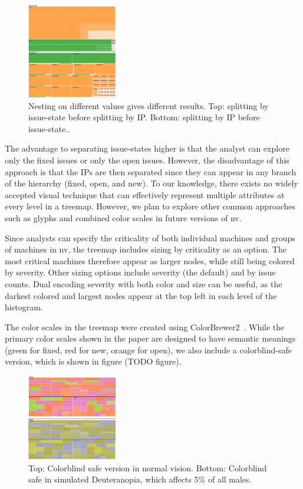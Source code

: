 \documentclass{acm_proc_article-sp}
\begin{document}
\begin{figure}
  \centering
  \includegraphics[width=0.35\textwidth]{../screenshots/state_issue}
  \caption{Nesting on different values gives different results. Top: splitting by issue-state before splitting by IP. Bottom: splitting by IP before issue-state..}
\end{figure}

The advantage to separating issue-states higher is that the analyst can explore only the fixed issues or only the open issues.
However, the disadvantage of this approach is that the IPs are then separated since they can appear in any branch of the hierarchy (fixed, open, and new).
To our knowledge, there exists no widely accepted visual technique that can effectively represent multiple attributes at every level in a treemap.
However, we plan to explore other common approaches such as glyphs and combined color scales in future versions of nv.


Since analysts can specify the criticality of both individual machines and groups of machines in nv, the treemap includes sizing by criticality as an option.
The most critical machines therefore appear as larger nodes, while still being colored by severity.
Other sizing options include severity (the default) and by issue counts.
Dual encoding severity with both color and size can be useful, as the darkest colored and largest nodes appear at the top left in each level of the histogram.

The color scales in the treemap were created using ColorBrewer2~\cite{colorbrewer2}.
While the primary color scales shown in the paper are designed to have semantic meanings (green for fixed, red for new, orange for open), we also include a colorblind-safe version, which is shown in figure (TODO figure).


\begin{figure}
  \centering
  \includegraphics[width=0.35\textwidth]{../screenshots/cb_version_both}
  \caption{Top: Colorblind safe version in normal vision. Bottom: Colorblind safe in simulated Deuteranopia, which affects 5\% of all males.}
\end{figure}
\end{document}
